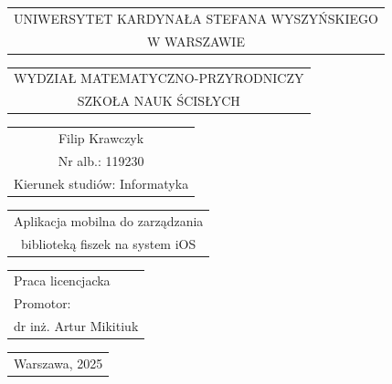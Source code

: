 \documentclass[final,a4paper,openany,12pt]{mwbk}
\begin{document}
\begin{titlepage}
\vspace{-0.5cm}

{\centering
{\footnotesize
\begin{tabular}{c}
UNIWERSYTET KARDYNAŁA STEFANA WYSZYŃSKIEGO\\
W WARSZAWIE\\
\end{tabular}
}
\vspace{2.5cm}

{\footnotesize
\begin{tabular}{c}
WYDZIAŁ MATEMATYCZNO-PRZYRODNICZY\\
SZKOŁA NAUK ŚCISŁYCH\\
\end{tabular}
}
\vspace{3.5cm}

\renewcommand{\arraystretch}{1.5} %

{\normalsize
\begin{tabular}{c}
Filip Krawczyk\\
Nr alb.: 119230\\
Kierunek studiów: Informatyka\\
\end{tabular}
}

\vspace{1.5cm}

{\large
\begin{tabular}{c}
Aplikacja mobilna do zarządzania \\ 
biblioteką fiszek na system iOS \\
\end{tabular}
}

}

\renewcommand{\arraystretch}{1} %

\vspace{5cm}

\hspace{6cm}
\begin{tabular}{l}
Praca licencjacka\\
Promotor:\\
dr inż. Artur Mikitiuk
\end{tabular}

\vspace{3cm}

{\centering

{\small
\begin{tabular}{c}
{Warszawa, 2025}\\
\end{tabular}
}

}
\end{titlepage}
\end{document}
